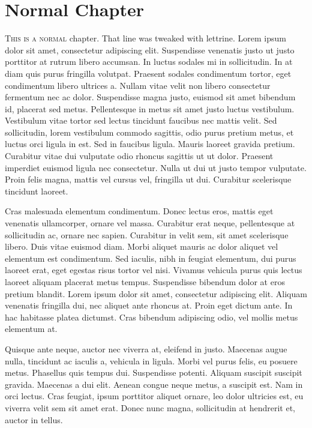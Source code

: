 \documentclass[12pt]{memoir}
\begin{document}
\chapter{Normal Chapter}
\lettrine{T}{his is a normal} chapter. That line was tweaked with lettrine. Lorem ipsum dolor sit amet, consectetur adipiscing elit. Suspendisse venenatis justo ut justo porttitor at rutrum libero accumsan. In luctus sodales mi in sollicitudin. In at diam quis purus fringilla volutpat. Praesent sodales condimentum tortor, eget condimentum libero ultrices a. Nullam vitae velit non libero consectetur fermentum nec ac dolor. Suspendisse magna justo, euismod sit amet bibendum id, placerat sed metus. Pellentesque in metus sit amet justo luctus vestibulum. Vestibulum vitae tortor sed lectus tincidunt faucibus nec mattis velit. Sed sollicitudin, lorem vestibulum commodo sagittis, odio purus pretium metus, et luctus orci ligula in est. Sed in faucibus ligula. Mauris laoreet gravida pretium. Curabitur vitae dui vulputate odio rhoncus sagittis ut ut dolor. Praesent imperdiet euismod ligula nec consectetur. Nulla ut dui ut justo tempor vulputate. Proin felis magna, mattis vel cursus vel, fringilla ut dui. Curabitur scelerisque tincidunt laoreet.


Cras malesuada elementum condimentum. Donec lectus eros, mattis eget venenatis ullamcorper, ornare vel massa. Curabitur erat neque, pellentesque at sollicitudin ac, ornare nec sapien. Curabitur in velit sem, sit amet scelerisque libero. Duis vitae euismod diam. Morbi aliquet mauris ac dolor aliquet vel elementum est condimentum. Sed iaculis, nibh in feugiat elementum, dui purus laoreet erat, eget egestas risus tortor vel nisi. Vivamus vehicula purus quis lectus laoreet aliquam placerat metus tempus. Suspendisse bibendum dolor at eros pretium blandit. Lorem ipsum dolor sit amet, consectetur adipiscing elit. Aliquam venenatis fringilla dui, nec aliquet ante rhoncus at. Proin eget dictum ante. In hac habitasse platea dictumst. Cras bibendum adipiscing odio, vel mollis metus elementum at.

Quisque ante neque, auctor nec viverra at, eleifend in justo. Maecenas augue nulla, tincidunt ac iaculis a, vehicula in ligula. Morbi vel purus felis, eu posuere metus. Phasellus quis tempus dui. Suspendisse potenti. Aliquam suscipit suscipit gravida. Maecenas a dui elit. Aenean congue neque metus, a suscipit est. Nam in orci lectus. Cras feugiat, ipsum porttitor aliquet ornare, leo dolor ultricies est, eu viverra velit sem sit amet erat. Donec nunc magna, sollicitudin at hendrerit et, auctor in tellus.
\end{document}
